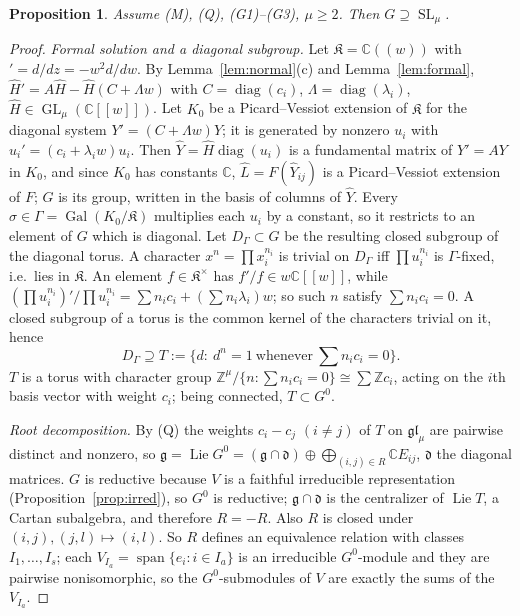 \documentclass[11pt]{article}
\numberwithin{equation}{section}
\newtheorem{proposition}[proposition]{Proposition}
\theoremstyle{definition}
\theoremstyle{remark}
\newcommand{\C}{\mathbb C}
\newcommand{\Z}{\mathbb Z}
\newcommand{\Span}{\operatorname{span}}
\newcommand{\Gal}{\operatorname{Gal}}
\newcommand{\Lie}{\operatorname{Lie}}
\newcommand{\SL}{\operatorname{SL}}
\newcommand{\GL}{\operatorname{GL}}
\begin{document}
\begin{proposition}\label{prop:SL}
Assume \textup{(M)}, \textup{(Q)}, \textup{(G1)--(G3)}, $\mu\ge2$. Then
$G\supseteq\SL_\mu$.
\end{proposition}
\begin{proof}
\emph{Formal solution and a diagonal subgroup.} Let $\mathfrak K=\C((w))$ with
$'=d/dz=-w^2d/dw$. By Lemma~\ref{lem:normal}(c) and Lemma~\ref{lem:formal},
$\widehat H'=A\widehat H-\widehat H(C+\Lambda w)$ with
$C=\operatorname{diag}(c_i)$, $\Lambda=\operatorname{diag}(\lambda_i)$,
$\widehat H\in\GL_\mu(\C[[w]])$. Let $K_0$ be a Picard--Vessiot extension of
$\mathfrak K$ for the diagonal system $Y'=(C+\Lambda w)Y$; it is generated by
nonzero $u_i$ with $u_i'=(c_i+\lambda_iw)u_i$. Then
$\widehat Y=\widehat H\operatorname{diag}(u_i)$ is a fundamental matrix of
$Y'=AY$ in $K_0$, and since $K_0$ has constants $\C$,
$\widehat L=F(\widehat Y_{ij})$ is a Picard--Vessiot extension of $F$; $G$ is its
group, written in the basis of columns of $\widehat Y$. Every
$\sigma\in\Gamma=\Gal(K_0/\mathfrak K)$ multiplies each $u_i$ by a constant, so
it restricts to an element of $G$ which is diagonal. Let $D_\Gamma\subset G$ be
the resulting closed subgroup of the diagonal torus. A character
$x^n=\prod x_i^{n_i}$ is trivial on $D_\Gamma$ iff $\prod u_i^{n_i}$ is
$\Gamma$-fixed, i.e.\ lies in $\mathfrak K$. An element $f\in\mathfrak K^\times$
has $f'/f\in w\C[[w]]$, while
$(\prod u_i^{n_i})'/\prod u_i^{n_i}=\sum n_ic_i+(\sum n_i\lambda_i)w$; so such
$n$ satisfy $\sum n_ic_i=0$. A closed subgroup of a torus is the common kernel
of the characters trivial on it, hence
\[
 D_\Gamma\supseteq T:=\{d:\ d^n=1\ \text{whenever}\ \textstyle\sum n_ic_i=0\}.
\]
$T$ is a torus with character group $\Z^\mu/\{n:\sum n_ic_i=0\}\cong\sum\Z c_i$,
acting on the $i$th basis vector with weight $c_i$; being connected,
$T\subset G^0$.

\emph{Root decomposition.} By (Q) the weights $c_i-c_j$ $(i\ne j)$ of $T$ on
$\mathfrak{gl}_\mu$ are pairwise distinct and nonzero, so
$\mathfrak g=\Lie G^0=(\mathfrak g\cap\mathfrak d)\oplus\bigoplus_{(i,j)\in R}\C E_{ij}$,
$\mathfrak d$ the diagonal matrices. $G$ is reductive because $V$ is a faithful
irreducible representation (Proposition~\ref{prop:irred}), so $G^0$ is
reductive; $\mathfrak g\cap\mathfrak d$ is the centralizer of $\Lie T$, a Cartan
subalgebra, and therefore $R=-R$. Also $R$ is closed under
$(i,j),(j,l)\mapsto(i,l)$. So $R$ defines an equivalence relation with classes
$I_1,\dots,I_s$; each $V_{I_a}=\Span\{e_i:i\in I_a\}$ is an irreducible
$G^0$-module and they are pairwise nonisomorphic, so the $G^0$-submodules of
$V$ are exactly the sums of the $V_{I_a}$.


\end{proof}
\end{document}
